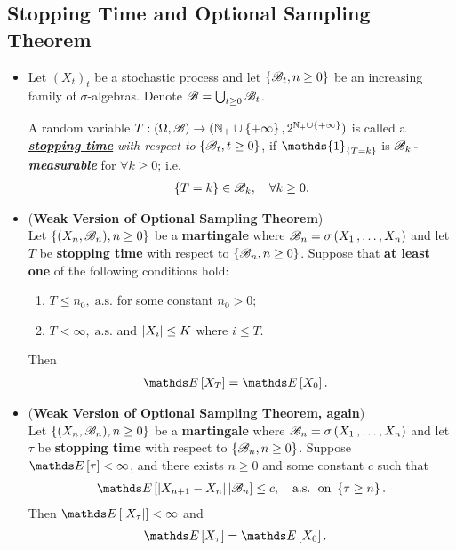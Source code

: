 \documentclass[11pt]{article}
\begin{document}
\subsection{Stopping Time and Optional Sampling Theorem}
\begin{itemize}
\item \begin{definition}
Let $(X_t)_t$ be a stochastic process and let $\left\{{\mathscr B}_t, n\ge 0\right\}$ be an increasing family of $\sigma$-algebras. Denote ${\mathscr B} = \bigcup_{t\ge 0} {\mathscr B}_t$.

A random variable $T: (\Omega, {\mathscr B}) \rightarrow ({\mathbb N}_{+}\cup\left\{+\infty\right\}, 2^{{\mathbb N}_{+}\cup\left\{+\infty\right\}})$ is called a \underline{\textbf{\emph{stopping time}}} \emph{with respect to} $\left\{{\mathscr B}_t, t\ge 0\right\}$, if $\mathds{1}_{\set{T = k}}$ is \textbf{\emph{${\mathscr B}_k$-measurable}} for $\forall k \ge 0$; i.e.
\begin{align*}
\left\{T = k\right\} \in {\mathscr B}_{k}, \quad \forall k \ge 0.
\end{align*}
\end{definition}


\item \begin{theorem}(\textbf{Weak Version of Optional Sampling Theorem}) \citep{billingsley2008probability}\\
Let $\left\{(X_n, {\mathscr B}_n), n \ge 0\right\}$ be a \textbf{martingale} where ${\mathscr B}_n = \sigma\left(X_1 \,{,}\ldots{,}\, X_n\right)$ and let $T$ be \textbf{stopping time} with respect to $\left\{{\mathscr B}_n, n \ge 0\right\}$. Suppose that \textbf{at least one} of the following conditions hold:
\begin{enumerate}
\item $T \le n_0,\; \text{a.s.}$ for some constant $n_0 >0$;
\item $T < \infty,\; \text{a.s.}$ and $\left\lvert X_i \right\rvert \le K$ where $i \le T$.
\end{enumerate} Then 
\begin{align*}
\E{}{X_T} &= \E{}{X_0}.
\end{align*} 
\end{theorem}

\item \begin{theorem}(\textbf{Weak Version of Optional Sampling Theorem, again}) \citep{billingsley2008probability}\\
Let $\left\{(X_n, {\mathscr B}_n), n \ge 0\right\}$ be a \textbf{martingale} where ${\mathscr B}_n = \sigma\left(X_1 \,{,}\ldots{,}\, X_n\right)$ and let $\tau$ be \textbf{stopping time} with respect to $\left\{{\mathscr B}_n, n \ge 0\right\}$. Suppose $\E{}{\tau} < \infty$, and there exists $n \ge 0$ and some constant $c$ such that 
\begin{align*}
\E{}{\abs{X_{n+1} - X_n} | \srB_n} \le c, \quad \text{a.s.} \; \text{ on }\set{\tau \ge n}.
\end{align*}
Then $\E{}{\abs{X_{\tau}}} < \infty$ and
\begin{align*}
\E{}{X_\tau} &= \E{}{X_0}.
\end{align*} 
\end{theorem}



\end{itemize}
\end{document}
